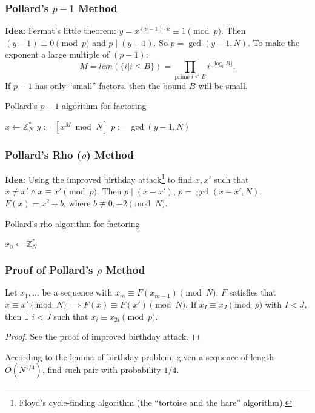 \begin{frame}\frametitle{Pollard's $p-1$ Method}
\textbf{Idea}: Fermat's little theorem: $y = x^{(p-1)\cdot k} \equiv 1 \pmod p$. Then $(y-1) \equiv 0 \pmod p$ and $p \mid (y-1)$. So $p = \gcd(y-1,N)$. To make the exponent a large multiple of $(p-1)$:
\[ M = lcm(\{ i | i \le B \}) = \prod_{\text{prime}\;i \le B}i^{\lfloor \log_iB \rfloor}.\]
If $p-1$ has only ``small'' factors, then the bound $B$ will be small.
\begin{algorithm}[H]
\DontPrintSemicolon
\caption{Pollard's $p-1$ algorithm for factoring}
\BlankLine

$x \gets \mathbb{Z}^*_N$\;
$y := [x^M \bmod N]$\;
$p := \gcd(y-1,N)$\;
\end{algorithm}
\end{frame}
\begin{frame}\frametitle{Pollard's Rho ($\rho$) Method}
\textbf{Idea}: Using the improved birthday attack\footnote{Floyd's cycle-finding algorithm (the ``tortoise and the hare'' algorithm).} to find $x,x'$ such that $x \neq x' \land x \equiv x' \pmod p$. Then $p \mid (x-x')$, $p = \gcd(x-x',N)$.
$F(x) = x^2+b$, where $b \not \equiv 0,-2 \pmod N$.
\begin{algorithm}[H]
\DontPrintSemicolon
\caption{Pollard's rho algorithm for factoring}
\BlankLine

$x_0 \gets \mathbb{Z}^*_N$\;
\end{algorithm}
\end{frame}
\begin{frame}\frametitle{Proof of Pollard's $\rho$ Method}
\begin{lemma}
Let $x_1,\dotsc$ be a sequence with $x_m \equiv F(x_{m-1}) \pmod N$. $F$ satisfies that $x \equiv x' \pmod N \implies F(x) \equiv F(x') \pmod N$. If $x_I \equiv x_J\pmod p$ with $I < J$, then $\exists$ $i < J$ such that $x_{i} \equiv x_{2i} \pmod p$.
\end{lemma}
\begin{figure}
\begin{center}

\end{center}
\end{figure}
\begin{proof}
See the proof of improved birthday attack.
\end{proof}
According to the lemma of birthday problem, given a sequence of length $O(N^{1/4})$, find such pair with probability $1/4$.
\end{frame}
